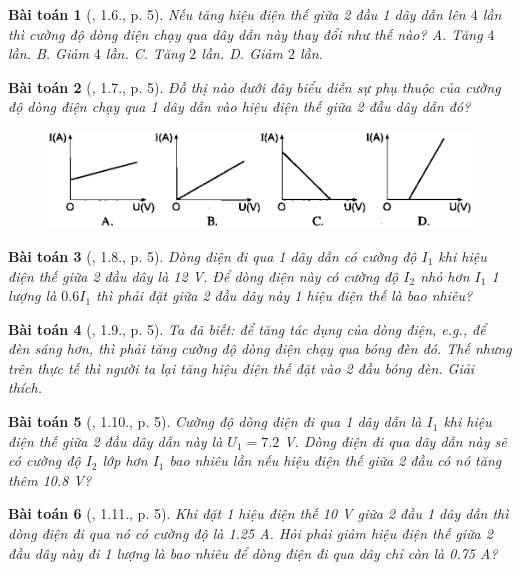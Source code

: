 \documentclass{article}
\newtheorem{baitoan}{Bài toán}
\begin{document}
\begin{baitoan}[\cite{SBT_Vat_Ly_9}, 1.6., p. 5]
	Nếu tăng hiệu điện thế giữa 2 đầu 1 dây dẫn lên $4$ lần thì cường độ dòng điện chạy qua dây dẫn này thay đổi như thế nào? {\sf A.} Tăng $4$ lần. {\sf B.} Giảm $4$ lần. {\sf C.} Tăng $2$ lần. {\sf D.} Giảm $2$ lần.
\end{baitoan}

\begin{baitoan}[\cite{SBT_Vat_Ly_9}, 1.7., p. 5]
	Đồ thị nào dưới đây biểu diễn sự phụ thuộc của cường độ dòng điện chạy qua 1 dây dẫn vào hiệu điện thế giữa 2 đầu dây dẫn đó?
	\begin{figure}[H]
		\centering
		\includegraphics[scale=0.3]{SBT_1.1}
	\end{figure}
\end{baitoan}

\begin{baitoan}[\cite{SBT_Vat_Ly_9}, 1.8., p. 5]
	Dòng điện đi qua 1 dây dẫn có cường độ $I_1$ khi hiệu điện thế giữa 2 đầu dây là \emph{12 V}. Để dòng điện này có cường độ $I_2$ nhỏ hơn $I_1$ 1 lượng là $0.6I_1$ thì phải đặt giữa 2 đầu dây này 1 hiệu điện thế là bao nhiêu?
\end{baitoan}

\begin{baitoan}[\cite{SBT_Vat_Ly_9}, 1.9., p. 5]
	Ta đã biết: để tăng tác dụng của dòng điện, e.g., để đèn sáng hơn, thì phải tăng cường độ dòng điện chạy qua bóng đèn đó. Thế nhưng trên thực tế thì người ta lại tăng hiệu điện thế đặt vào 2 đầu bóng đèn. Giải thích.
\end{baitoan}

\begin{baitoan}[\cite{SBT_Vat_Ly_9}, 1.10., p. 5]
	Cường độ dòng điện đi qua 1 dây dẫn là $I_1$ khi hiệu điện thế giữa 2 đầu dây dẫn này là $U_1 = 7.2$ \emph{V}. Dòng điện đi qua dây dẫn này sẽ có cường độ $I_2$ lớp hơn $I_1$ bao nhiêu lần nếu hiệu điện thế giữa 2 đầu có nó tăng thêm \emph{10.8 V}?
\end{baitoan}

\begin{baitoan}[\cite{SBT_Vat_Ly_9}, 1.11., p. 5]
	Khi đặt 1 hiệu điện thế \emph{10 V} giữa 2 đầu 1 dây dẫn thì dòng điện đi qua nó có cường độ là \emph{1.25 A}. Hỏi phải giảm hiệu điện thế giữa 2 đầu dây này đi 1 lượng là bao nhiêu để dòng điện đi qua dây chỉ còn là \emph{0.75 A}?
\end{baitoan}
\end{document}
